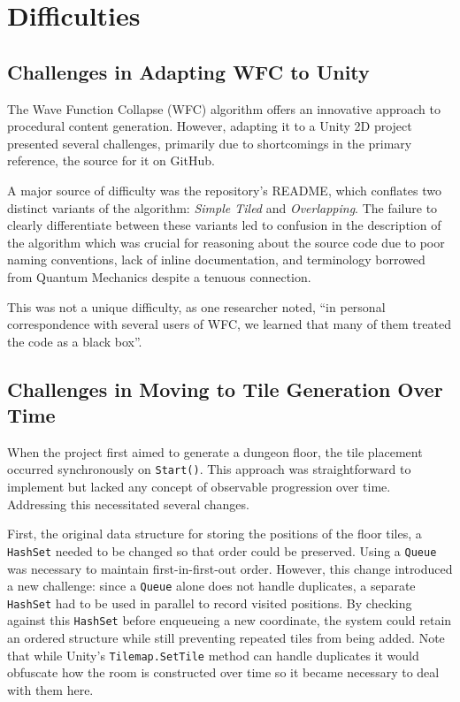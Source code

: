 \documentclass[a4paper, 12pt, one column, aas_macros]{article}
\begin{document}
\section{Difficulties}
\subsection{Challenges in Adapting WFC to Unity}
The Wave Function Collapse (WFC) algorithm offers an innovative approach to procedural content generation. However, adapting it to a Unity 2D project presented several challenges, primarily due to shortcomings in the primary reference, the source for it on GitHub. \cite{mxgmn}

A major source of difficulty was the repository’s README, which conflates two distinct variants of the algorithm: \emph{Simple Tiled} and \emph{Overlapping}. The failure to clearly differentiate between these variants led to confusion in the description of the algorithm which was crucial for reasoning about the source code due to poor naming conventions, lack of inline documentation, and terminology borrowed from Quantum Mechanics despite a tenuous connection.

This was not a unique difficulty, as one researcher noted, ``in personal correspondence with several users of WFC, we learned that many of them treated the code as a black box''. \citep{karth}


\subsection{Challenges in Moving to Tile Generation Over Time}
When the project first aimed to generate a dungeon floor, the tile placement occurred synchronously on \texttt{Start()}. This approach was straightforward to implement but lacked any concept of observable progression over time. Addressing this necessitated several changes. 

First, the original data structure for storing the positions of the floor tiles, a \texttt{HashSet} needed to be changed so that order could be preserved. Using a \texttt{Queue} was necessary to maintain first-in-first-out order. However, this change introduced a new challenge: since a \texttt{Queue} alone does not handle duplicates, a separate \texttt{HashSet} had to be used in parallel to record visited positions. By checking against this \texttt{HashSet} before enqueueing a new coordinate, the system could retain an ordered structure while still preventing repeated tiles from being added. Note that while Unity's \texttt{Tilemap.SetTile} method can handle duplicates it would obfuscate how the room is constructed over time so it became necessary to deal with them here. 
\end{document}
